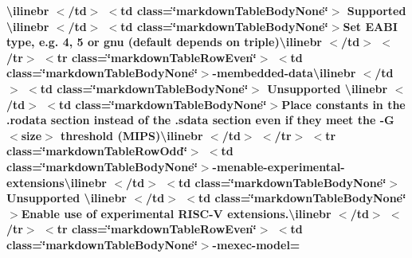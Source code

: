 \begin{longtabu}
{\bfseries{{\ttfamily \textbackslash{}ilinebr \texorpdfstring{$<$}{<}/td\texorpdfstring{$>$}{>} \texorpdfstring{$<$}{<}td class=\char`\"{}markdown\+Table\+Body\+None\char`\"{}\texorpdfstring{$>$}{>} Supported \textbackslash{}ilinebr \texorpdfstring{$<$}{<}/td\texorpdfstring{$>$}{>} \texorpdfstring{$<$}{<}td class=\char`\"{}markdown\+Table\+Body\+None\char`\"{}\texorpdfstring{$>$}{>}}Set EABI type, e.\+g. 4, 5 or gnu (default depends on triple){\ttfamily \textbackslash{}ilinebr \texorpdfstring{$<$}{<}/td\texorpdfstring{$>$}{>} \texorpdfstring{$<$}{<}/tr\texorpdfstring{$>$}{>} \texorpdfstring{$<$}{<}tr class=\char`\"{}markdown\+Table\+Row\+Even\char`\"{}\texorpdfstring{$>$}{>} \texorpdfstring{$<$}{<}td class=\char`\"{}markdown\+Table\+Body\+None\char`\"{}\texorpdfstring{$>$}{>}}-\/membedded-\/data{\ttfamily \textbackslash{}ilinebr \texorpdfstring{$<$}{<}/td\texorpdfstring{$>$}{>} \texorpdfstring{$<$}{<}td class=\char`\"{}markdown\+Table\+Body\+None\char`\"{}\texorpdfstring{$>$}{>} Unsupported \textbackslash{}ilinebr \texorpdfstring{$<$}{<}/td\texorpdfstring{$>$}{>} \texorpdfstring{$<$}{<}td class=\char`\"{}markdown\+Table\+Body\+None\char`\"{}\texorpdfstring{$>$}{>}}Place constants in the .rodata section instead of the .sdata section even if they meet the -\/G $<$size$>$ threshold (MIPS){\ttfamily \textbackslash{}ilinebr \texorpdfstring{$<$}{<}/td\texorpdfstring{$>$}{>} \texorpdfstring{$<$}{<}/tr\texorpdfstring{$>$}{>} \texorpdfstring{$<$}{<}tr class=\char`\"{}markdown\+Table\+Row\+Odd\char`\"{}\texorpdfstring{$>$}{>} \texorpdfstring{$<$}{<}td class=\char`\"{}markdown\+Table\+Body\+None\char`\"{}\texorpdfstring{$>$}{>}}-\/menable-\/experimental-\/extensions{\ttfamily \textbackslash{}ilinebr \texorpdfstring{$<$}{<}/td\texorpdfstring{$>$}{>} \texorpdfstring{$<$}{<}td class=\char`\"{}markdown\+Table\+Body\+None\char`\"{}\texorpdfstring{$>$}{>} Unsupported \textbackslash{}ilinebr \texorpdfstring{$<$}{<}/td\texorpdfstring{$>$}{>} \texorpdfstring{$<$}{<}td class=\char`\"{}markdown\+Table\+Body\+None\char`\"{}\texorpdfstring{$>$}{>}}Enable use of experimental RISC-\/V extensions.{\ttfamily \textbackslash{}ilinebr \texorpdfstring{$<$}{<}/td\texorpdfstring{$>$}{>} \texorpdfstring{$<$}{<}/tr\texorpdfstring{$>$}{>} \texorpdfstring{$<$}{<}tr class=\char`\"{}markdown\+Table\+Row\+Even\char`\"{}\texorpdfstring{$>$}{>} \texorpdfstring{$<$}{<}td class=\char`\"{}markdown\+Table\+Body\+None\char`\"{}\texorpdfstring{$>$}{>}}-\/mexec-\/model=}}


\end{longtabu}
